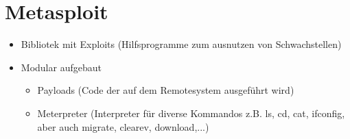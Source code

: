 \section{Metasploit \cite{MSPLH}}\label{sec:metasploit}
\begin{itemize}
    \item Bibliotek mit Exploits (Hilfsprogramme zum ausnutzen von Schwachstellen)
    \item Modular aufgebaut
        \begin{itemize}
            \item Payloads (Code der auf dem Remotesystem ausgeführt wird)
            \item Meterpreter (Interpreter für diverse Kommandos z.B. ls, cd, cat, ifconfig, aber auch migrate, clearev, download,...)
        \end{itemize}
\end{itemize}